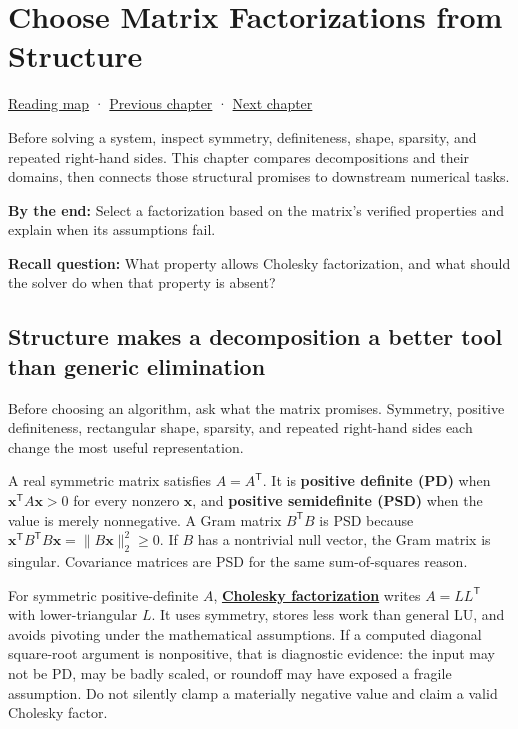 \chapter{Choose Matrix Factorizations from Structure}\label{01-foundations-i-ch020-choose-matrix-factorizations-from-structure}\hypertarget{01-foundations-i-ch020}{}\label{stagechapter:01-foundations-i-ch020}

\hyperref[volume-reading-map]{Reading map} · \hyperref[01-foundations-i-ch019-coordinate-frames-and-linear-systems]{Previous chapter} · \hyperref[02-foundations-ii-ch021-multivariable-derivatives-and-sensitivity]{Next chapter}

Before solving a system, inspect symmetry, definiteness, shape, sparsity, and repeated right-hand sides. This chapter compares decompositions and their domains, then connects those structural promises to downstream numerical tasks.

\textbf{By the end:} Select a factorization based on the matrix's verified properties and explain when its assumptions fail.

\textbf{Recall question:} What property allows Cholesky factorization, and what should the solver do when that property is absent?

\section{Structure makes a decomposition a better tool than generic elimination}\label{01-foundations-i-ch020-structure-makes-a-decomposition-a-better-tool-than-generic-elimination}

Before choosing an algorithm, ask what the matrix promises. Symmetry, positive definiteness, rectangular shape, sparsity, and repeated right-hand sides each change the most useful representation.

A real symmetric matrix satisfies \(A=A^\mathsf T\). It is \textbf{positive definite (PD)} when \(\mathbf x^\mathsf T A\mathbf x>0\) for every nonzero \(\mathbf x\), and \textbf{positive semidefinite (PSD)} when the value is merely nonnegative. A Gram matrix \(B^\mathsf T B\) is PSD because \(\mathbf x^\mathsf T B^\mathsf T B\mathbf x=\|B\mathbf x\|_2^2\ge0\). If \(B\) has a nontrivial null vector, the Gram matrix is singular. Covariance matrices are PSD for the same sum-of-squares reason.

For symmetric positive-definite \(A\), \textbf{\hyperref[01-foundations-i-ch020-positive-definiteness-is-a-structural-promise]{Cholesky factorization}} writes \(A=LL^\mathsf T\) with lower-triangular \(L\). It uses symmetry, stores less work than general LU, and avoids pivoting under the mathematical assumptions. If a computed diagonal square-root argument is nonpositive, that is diagnostic evidence: the input may not be PD, may be badly scaled, or roundoff may have exposed a fragile assumption. Do not silently clamp a materially negative value and claim a valid Cholesky factor.

